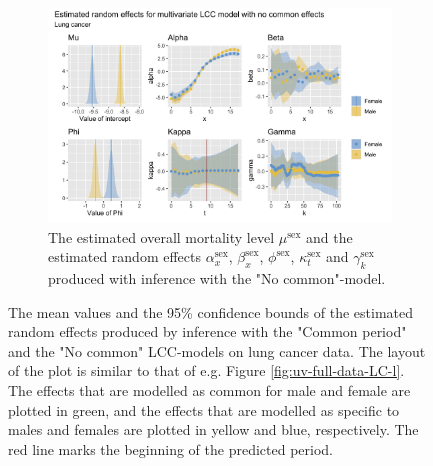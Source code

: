 \begin{figure}
    \begin{subfigure}[b]{.75\linewidth}
        \includegraphics[width=\linewidth]{real-data/real-data-multivariate/Figures/effects-LCC-no-common-lung.png}
        \caption{The estimated overall mortality level $\mu^{\text{sex}}$ and the estimated random effects $\alpha_x^{\text{sex}}$, $\beta_x^{\text{sex}}$, $\phi^{\text{sex}}$, $\kappa_t^{\text{sex}}$ and $\gamma_k^{\text{sex}}$ produced with inference with the "No common"-model.}
        \label{fig:effects-LCC-lung-bottom}
    \end{subfigure}
    \caption{The mean values and the 95\% confidence bounds of the estimated random effects produced by inference with the "Common period" and the "No common" LCC-models on lung cancer data. The layout of the plot is similar to that of e.g. Figure \ref{fig:uv-full-data-LC-l}. The effects that are modelled as common for male and female are plotted in green, and the effects that are modelled as specific to males and females are plotted in yellow and blue, respectively. The red line marks the beginning of the predicted period. }
    \label{fig:effects-LCC-lung}
\end{figure}

